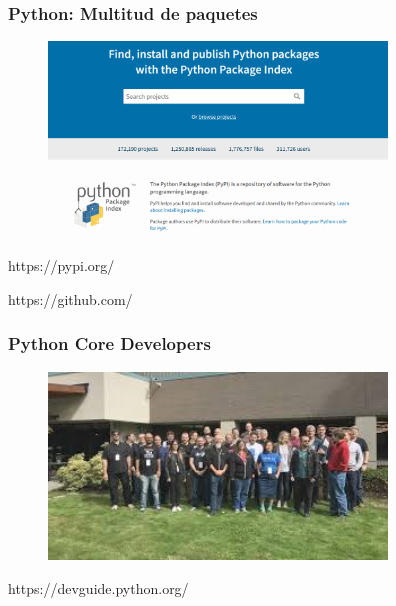\documentclass[18pt]{beamer}
\begin{document}
\begin{frame}

	\frametitle{Python: Multitud de paquetes}
	
	\begin{figure}
		\includegraphics[width=9cm]{images/pypi.png}
	\end{figure}
	
	\vspace{0.2cm}
	\centerline{https://pypi.org/}

	\vspace{0.2cm}
	\centerline{https://github.com/}	
	
\end{frame}


\begin{frame}

	\frametitle{Python Core Developers}
	
	\begin{figure}
		\includegraphics[width=9cm]{images/python_core_developers.jpeg}
	\end{figure}
	
	\vspace{0.2cm}
	\centerline{https://devguide.python.org/}
	
\end{frame}
\end{document}
